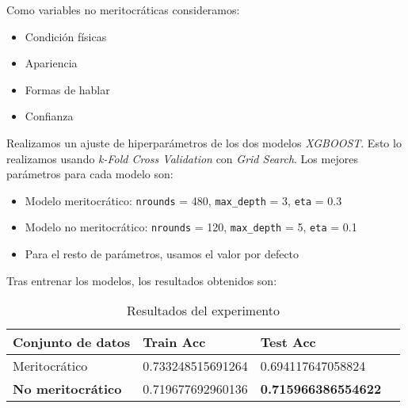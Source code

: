 Como variables no meritocráticas consideramos:
\begin{itemize}
    \item Condición físicas
    \item Apariencia
    \item Formas de hablar
    \item Confianza
\end{itemize}

Realizamos un ajuste de hiperparámetros de los dos modelos \textit{XGBOOST}. Esto lo realizamos usando \textit{k-Fold Cross Validation} con \textit{Grid Search}. Los mejores parámetros para cada modelo son:

\begin{itemize}
    \item Modelo meritocrático: \lstinline{nrounds} = 480, \lstinline{max_depth} = 3, \lstinline{eta} = 0.3
    \item Modelo no meritocrático: \lstinline{nrounds} = 120, \lstinline{max_depth} = 5, \lstinline{eta} = 0.1
    \item Para el resto de parámetros, usamos el valor por defecto
\end{itemize}

Tras entrenar los modelos, los resultados obtenidos son:

\begin{table}[H]
\centering
\begin{tabular}{|l|l|l|l}
\hline
Conjunto de datos    & Train Acc         & Test Acc              \\
\hline
Meritocrático        & 0.733248515691264 & 0.694117647058824     \\
    \textbf{No meritocrático} & 0.719677692960136 & \textbf{0.715966386554622} \\
\hline

\end{tabular}
\caption{Resultados del experimento}
\label{table:resultados_experimento}
\end{table}


